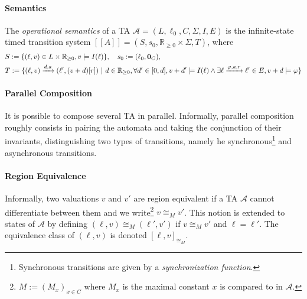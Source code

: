 \documentclass[11pt]{article}
\theoremstyle{definition}
\theoremstyle{remark}
\begin{document}
\paragraph{Semantics}\label{par:semantics}
The \emph{operational semantics} of a TA $\mathcal{A} = (L, \ell_0, C, \Sigma, I, E)$ is the infinite-state timed transition system $[\![A]\!] = (S, s_0, \mathbb{R}_{\geq 0} \times \Sigma, T)$, where
\begin{align*}
	&S := \{(\ell, v) \in L \times \mathbb{R}_{\geq 0}, v \models I(\ell)\}, \quad s_0 := (\ell_0, \text{\bf 0}_C),\\
	&T := \{(\ell, v) \xrightarrow{d, a} (\ell', (v+d)[r]) \ | \ d \in \mathbb{R}_{\geq 0}, \forall d' \in [0, d], v + d' \models I(\ell) \land \exists \ell \xrightarrow{\varphi, a, r} \ell' \in E, v + d \models \varphi \}
\end{align*}


\paragraph{Parallel Composition}\label{par:ta_parcomp}
It is possible to compose several TA in parallel. Informally, parallel composition roughly consists in pairing the automata and taking the conjunction of their invariants, distinguishing two types of transitions, namely he synchronous\footnote{Synchronous transitions are given by a \emph{synchronization function}.} and asynchronous transitions.

\paragraph{Region Equivalence}\label{par:ta_regeq}
Informally, two valuations $v$ and $v'$ are region equivalent if a TA $\mathcal{A}$ cannot differentiate between them and we write\footnote{$M := (M_x)_{x \in C}$ where $M_x$ is the maximal constant $x$ is compared to in $\mathcal{A}$.} $v \cong_M v'$. This notion is extended to states of $\mathcal{A}$ by defining $(\ell, v) \cong_M (\ell', v')$ if $v \cong_M v'$ and $\ell = \ell'$. The equivalence class of $(\ell, v)$ is denoted $[\ell, v]_{\cong_M}$.
\end{document}
